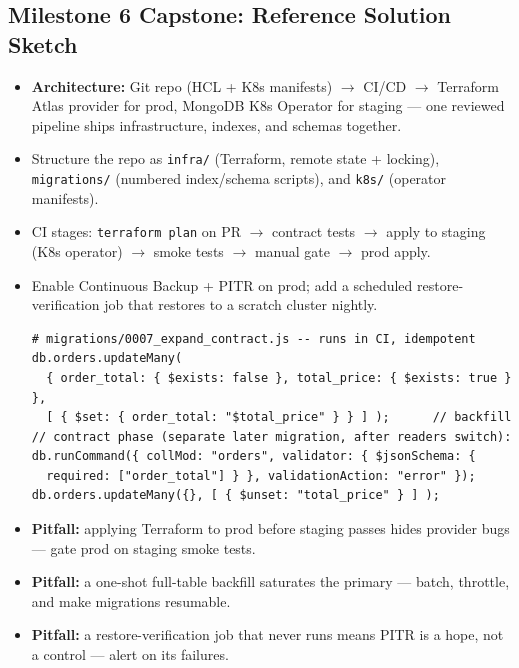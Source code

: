 \documentclass[11pt, a4paper]{article}
\begin{document}
\subsection*{Milestone 6 Capstone: Reference Solution Sketch}
\begin{itemize}[label=-, itemsep=0pt]
    \item \textbf{Architecture:} Git repo (HCL + K8s manifests) $\to$ CI/CD $\to$ Terraform Atlas provider for prod, MongoDB K8s Operator for staging --- one reviewed pipeline ships infrastructure, indexes, and schemas together.
    \item Structure the repo as \texttt{infra/} (Terraform, remote state + locking), \texttt{migrations/} (numbered index/schema scripts), and \texttt{k8s/} (operator manifests).
    \item CI stages: \texttt{terraform plan} on PR $\to$ contract tests $\to$ apply to staging (K8s operator) $\to$ smoke tests $\to$ manual gate $\to$ prod apply.
    \item Enable Continuous Backup + PITR on prod; add a scheduled restore-verification job that restores to a scratch cluster nightly.
\begin{lstlisting}
# migrations/0007_expand_contract.js -- runs in CI, idempotent
db.orders.updateMany(
  { order_total: { $exists: false }, total_price: { $exists: true } },
  [ { $set: { order_total: "$total_price" } } ] );      // backfill
// contract phase (separate later migration, after readers switch):
db.runCommand({ collMod: "orders", validator: { $jsonSchema: {
  required: ["order_total"] } }, validationAction: "error" });
db.orders.updateMany({}, [ { $unset: "total_price" } ] );
\end{lstlisting}
    \item \textbf{Pitfall:} applying Terraform to prod before staging passes hides provider bugs --- gate prod on staging smoke tests.
    \item \textbf{Pitfall:} a one-shot full-table backfill saturates the primary --- batch, throttle, and make migrations resumable.
    \item \textbf{Pitfall:} a restore-verification job that never runs means PITR is a hope, not a control --- alert on its failures.
\end{itemize}
\end{document}
